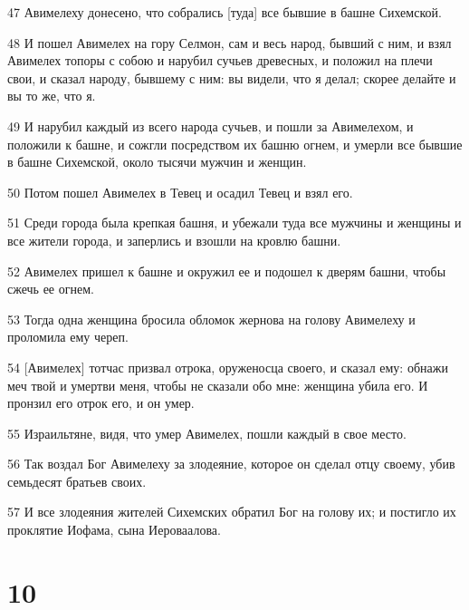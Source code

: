 \par 47 Авимелеху донесено, что собрались [туда] все бывшие в башне Сихемской.
\par 48 И пошел Авимелех на гору Селмон, сам и весь народ, бывший с ним, и взял Авимелех топоры с собою и нарубил сучьев древесных, и положил на плечи свои, и сказал народу, бывшему с ним: вы видели, что я делал; скорее делайте и вы то же, что я.
\par 49 И нарубил каждый из всего народа сучьев, и пошли за Авимелехом, и положили к башне, и сожгли посредством их башню огнем, и умерли все бывшие в башне Сихемской, около тысячи мужчин и женщин.
\par 50 Потом пошел Авимелех в Тевец и осадил Тевец и взял его.
\par 51 Среди города была крепкая башня, и убежали туда все мужчины и женщины и все жители города, и заперлись и взошли на кровлю башни.
\par 52 Авимелех пришел к башне и окружил ее и подошел к дверям башни, чтобы сжечь ее огнем.
\par 53 Тогда одна женщина бросила обломок жернова на голову Авимелеху и проломила ему череп.
\par 54 [Авимелех] тотчас призвал отрока, оруженосца своего, и сказал ему: обнажи меч твой и умертви меня, чтобы не сказали обо мне: женщина убила его. И пронзил его отрок его, и он умер.
\par 55 Израильтяне, видя, что умер Авимелех, пошли каждый в свое место.
\par 56 Так воздал Бог Авимелеху за злодеяние, которое он сделал отцу своему, убив семьдесят братьев своих.
\par 57 И все злодеяния жителей Сихемских обратил Бог на голову их; и постигло их проклятие Иофама, сына Иероваалова.

\chapter{10}

